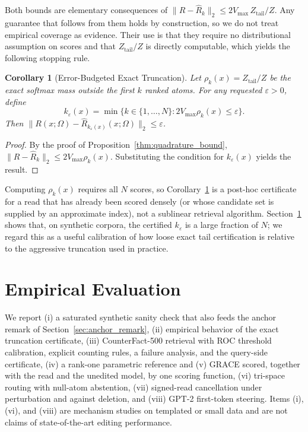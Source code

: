 \documentclass[preprint,12pt]{elsarticle}
\newtheorem{corollary}{Corollary}
\newcommand{\Om}{\Omega}
\newif\ifmarkchanges
\newcommand{\rev}[1]{\ifmarkchanges{\color{blue}#1}\else#1\fi}
\begin{document}
Both bounds are elementary consequences of $\|R-\hat R_k\|_2 \le 2V_{\max}\,Z_{\mathrm{tail}}/Z$. \rev{Any guarantee that follows from them holds by construction, so we do not treat empirical coverage as evidence.} Their use is that they require no distributional assumption on scores and that $Z_{\mathrm{tail}}/Z$ is directly computable, which yields the following stopping rule.

\begin{corollary}[Error-Budgeted Exact Truncation]
\label{cor:adaptive_k}
Let $\rho_k(x) = Z_{\mathrm{tail}}/Z$ be the exact softmax mass outside the first $k$ ranked atoms. For any requested $\varepsilon > 0$, define
\[
  k_\varepsilon(x) = \min\{k \in \{1,\dots,N\} : 2 V_{\max} \rho_k(x) \le \varepsilon\}.
\]
Then $\|R(x;\Om) - \hat R_{k_\varepsilon(x)}(x;\Om)\|_2 \le \varepsilon$.
\end{corollary}

\begin{proof}
By the proof of Proposition~\ref{thm:quadrature_bound}, $\|R - \hat R_k\|_2 \le 2 V_{\max} \rho_k(x)$. Substituting the condition for $k_\varepsilon(x)$ yields the result. \qedhere
\end{proof}

Computing $\rho_k(x)$ requires all $N$ scores, so Corollary~\ref{cor:adaptive_k} is a post-hoc certificate for a read that has already been scored densely (or whose candidate set is supplied by an approximate index), not a sublinear retrieval algorithm. Section~\ref{sec:empirical} shows that, on synthetic corpora, the certified $k_\varepsilon$ is a large fraction of $N$; we regard this as a useful calibration of how loose exact tail certification is relative to the aggressive truncation used in practice.

\section{Empirical Evaluation}
\label{sec:empirical}

We report (i) a saturated synthetic sanity check that also feeds the anchor remark of Section~\ref{sec:anchor_remark}, (ii) empirical behavior of the exact truncation certificate, (iii) CounterFact-500 retrieval with ROC threshold calibration, \rev{explicit counting rules, a failure analysis, and the query-side certificate}, (iv) a rank-one parametric reference and (v) GRACE \rev{scored, together with the read and the unedited model, by one scoring function}, (vi) tri-space routing \rev{with null-atom abstention}, (vii) signed-read cancellation under perturbation \rev{and against deletion}, and (viii) GPT-2 first-token steering. Items (i), (vi), and (viii) are mechanism studies on templated or small data and are not claims of state-of-the-art editing performance.
\end{document}
